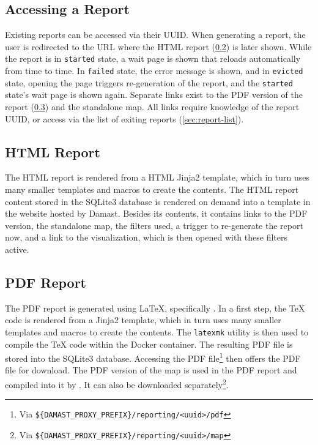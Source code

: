 \subsection{Accessing a Report}
\label{sec:report-access}

Existing reports can be accessed via their UUID.
When generating a report, the user is redirected to the URL where the HTML report (\cref{sec:report-html}) is later shown.
While the report is in \verb!started! state, a wait page is shown that reloads automatically from time to time.
In \verb!failed! state, the error message is shown, and in \verb!evicted! state, opening the page triggers re-generation of the report, and the \verb!started! state's wait page is shown again.
Separate links exist to the PDF version of the report (\cref{sec:report-pdf}) and the standalone map.
All links require knowledge of the report UUID, or access via the list of exiting reports (\cref{sec:report-list}).


\subsection{HTML Report}
\label{sec:report-html}

The HTML report is rendered from a HTML Jinja2 template, which in turn uses many smaller templates and macros to create the contents.
The HTML report content stored in the SQLite3 database is rendered on demand into a template in the website hosted by Damast.
Besides its contents, it contains links to the PDF version, the standalone map, the filters used, a trigger to re-generate the report now, and a link to the visualization, which is then opened with these filters active.


\subsection{PDF Report}
\label{sec:report-pdf}

The PDF report is generated using \LaTeX{}, specifically \XeLaTeX.
In a first step, the \TeX{} code is rendered from a Jinja2 template, which in turn uses many smaller templates and macros to create the contents.
The \verb!latexmk! utility is then used to compile the \TeX{} code within the Docker container.
The resulting PDF file is stored into the SQLite3 database.
Accessing the PDF file\footnote{Via \texttt{\$\{DAMAST\_PROXY\_PREFIX\}/reporting/<uuid>/pdf}} then offers the PDF file for download.
The PDF version of the map is used in the PDF report and compiled into it by \XeLaTeX{}.
It can also be downloaded separately\footnote{Via \texttt{\$\{DAMAST\_PROXY\_PREFIX\}/reporting/<uuid>/map}}.


